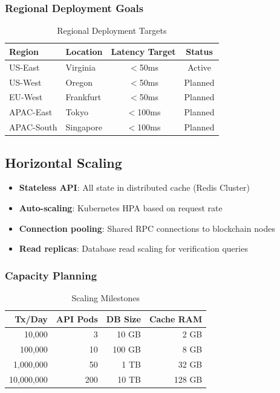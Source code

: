 \subsubsection{Regional Deployment Goals}

\begin{table}[htbp]
\centering
\caption{Regional Deployment Targets}
\label{tab:regional-targets}
\begin{tabular}{@{}llcc@{}}
\toprule
\textbf{Region} & \textbf{Location} & \textbf{Latency Target} & \textbf{Status} \\
\midrule
US-East & Virginia & $<$50ms & Active \\
US-West & Oregon & $<$50ms & Planned \\
EU-West & Frankfurt & $<$50ms & Planned \\
APAC-East & Tokyo & $<$100ms & Planned \\
APAC-South & Singapore & $<$100ms & Planned \\
\bottomrule
\end{tabular}
\end{table}

\subsection{Horizontal Scaling}

\begin{itemize}
    \item \textbf{Stateless API}: All state in distributed cache (Redis Cluster)
    \item \textbf{Auto-scaling}: Kubernetes HPA based on request rate
    \item \textbf{Connection pooling}: Shared RPC connections to blockchain nodes
    \item \textbf{Read replicas}: Database read scaling for verification queries
\end{itemize}

\subsubsection{Capacity Planning}

\begin{table}[htbp]
\centering
\caption{Scaling Milestones}
\label{tab:scaling-milestones}
\begin{tabular}{@{}rrrr@{}}
\toprule
\textbf{Tx/Day} & \textbf{API Pods} & \textbf{DB Size} & \textbf{Cache RAM} \\
\midrule
10,000 & 3 & 10 GB & 2 GB \\
100,000 & 10 & 100 GB & 8 GB \\
1,000,000 & 50 & 1 TB & 32 GB \\
10,000,000 & 200 & 10 TB & 128 GB \\
\bottomrule
\end{tabular}
\end{table}

